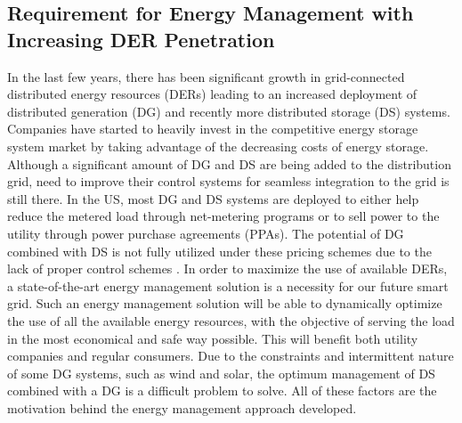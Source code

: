
\subsection{Requirement for Energy Management with Increasing DER Penetration}
In the last few years, there has been significant growth in grid-connected distributed energy resources (DERs) leading to an increased deployment of distributed generation (DG) and recently more distributed storage (DS) systems. Companies have started to heavily invest in the competitive energy storage system market by taking advantage of the decreasing costs of energy storage. Although a significant amount of DG and DS are being added to the distribution grid, need to improve their control systems for seamless integration to the grid is still there. In the US, most DG and DS systems are deployed to either help reduce the metered load through net-metering programs or to sell power to the utility through power purchase agreements (PPAs). The potential of DG combined with DS is not fully utilized under these pricing schemes due to the lack of proper control schemes \cite{CONF_1}. In order to maximize the use of available DERs, a state-of-the-art energy management solution is a necessity for our future smart grid. Such an energy management solution will be able to dynamically optimize the use of all the available energy resources, with the objective of serving the load in the most economical and safe way possible. This will benefit both utility companies and regular consumers. Due to the constraints and intermittent nature of some DG systems, such as wind and solar, the optimum management of DS combined with a DG is a difficult problem to solve. All of these factors are the motivation behind the energy management approach developed.

